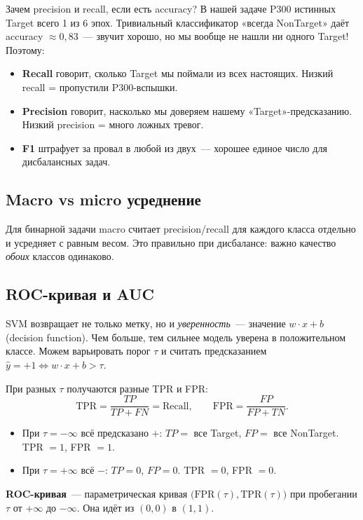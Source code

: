 \documentclass[12pt,a4paper]{article}
\begin{document}
\begin{intuition}
Зачем precision и recall, если есть accuracy? В нашей задаче P300 истинных Target всего 1 из 6 эпох. Тривиальный классификатор «всегда NonTarget» даёт accuracy $\approx 0{,}83$~--- звучит хорошо, но мы вообще не нашли ни одного Target! Поэтому:
\begin{itemize}
  \item \textbf{Recall} говорит, сколько Target мы поймали из всех настоящих. Низкий recall = пропустили P300-вспышки.
  \item \textbf{Precision} говорит, насколько мы доверяем нашему «Target»-предсказанию. Низкий precision = много ложных тревог.
  \item \textbf{F1} штрафует за провал в любой из двух~--- хорошее единое число для дисбалансных задач.
\end{itemize}
\end{intuition}

\subsection{Macro vs micro усреднение}

Для бинарной задачи macro считает precision/recall для каждого класса отдельно и усредняет с равным весом. Это правильно при дисбалансе: важно качество \emph{обоих} классов одинаково.

\subsection{ROC-кривая и AUC}

SVM возвращает не только метку, но и \emph{уверенность}~--- значение $w \cdot x + b$ (decision function). Чем больше, тем сильнее модель уверена в положительном классе. Можем варьировать порог $\tau$ и считать предсказанием $\hat{y} = +1 \iff w \cdot x + b > \tau$.

При разных $\tau$ получаются разные TPR и FPR:
\[
  \text{TPR} = \frac{TP}{TP + FN} = \text{Recall}, \qquad \text{FPR} = \frac{FP}{FP + TN}.
\]

\begin{itemize}
  \item При $\tau = -\infty$ всё предсказано $+$: $TP = $ все Target, $FP = $ все NonTarget. TPR $= 1$, FPR $= 1$.
  \item При $\tau = +\infty$ всё $-$: $TP = 0$, $FP = 0$. TPR $= 0$, FPR $= 0$.
\end{itemize}

\textbf{ROC-кривая}~--- параметрическая кривая $\bigl(\text{FPR}(\tau), \text{TPR}(\tau)\bigr)$ при пробегании $\tau$ от $+\infty$ до $-\infty$. Она идёт из $(0,0)$ в $(1,1)$.
\end{document}
